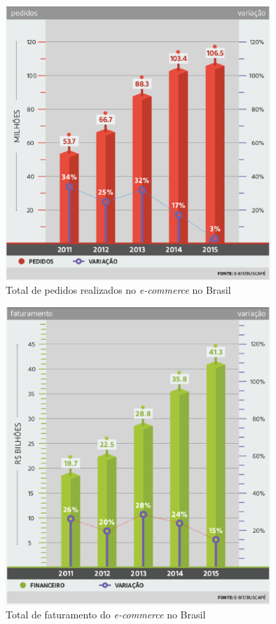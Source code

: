 \documentclass[a4paper,12pt]{monografia}
\begin{document}
\begin{figure}[H]
\centering
\includegraphics[width=10cm]{img/webshoppers/total-pedidos.eps}
\caption{Total de pedidos realizados no \textit{e-commerce} no Brasil}
\label{figura:pedidos}
\end{figure}

\begin{figure}[H]
\centering
\includegraphics[width=10cm]{img/webshoppers/faturamento.eps}
\caption{Total de faturamento do \textit{e-commerce} no Brasil}
\label{figura:vendas}
\end{figure}
\end{document}
